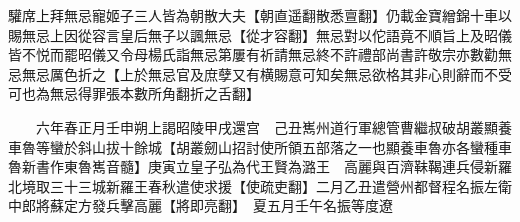 驩席上拜無忌寵姬子三人皆為朝散大夫【朝直遥翻散悉亶翻】仍載金寶繒錦十車以賜無忌上因從容言皇后無子以諷無忌【從才容翻】無忌對以佗語竟不順旨上及昭儀皆不悦而罷昭儀又令母楊氏詣無忌第屢有祈請無忌終不許禮部尚書許敬宗亦數勸無忌無忌厲色折之【上於無忌官及庶孽又有横賜意可知矣無忌欲格其非心則辭而不受可也為無忌得罪張本數所角翻折之舌翻】

　　六年春正月壬申朔上謁昭陵甲戌還宫　己丑嶲州道行軍總管曹繼叔破胡叢顯養車魯等蠻於斜山拔十餘城【胡叢劒山招討使所領五部落之一也顯養車魯亦各蠻種車魯新書作東魯嶲音髓】庚寅立皇子弘為代王賢為潞王　高麗與百濟靺鞨連兵侵新羅北境取三十三城新羅王春秋遣使求援【使疏吏翻】二月乙丑遣營州都督程名振左衛中郎將蘇定方發兵擊高麗【將即亮翻】　夏五月壬午名振等度遼
